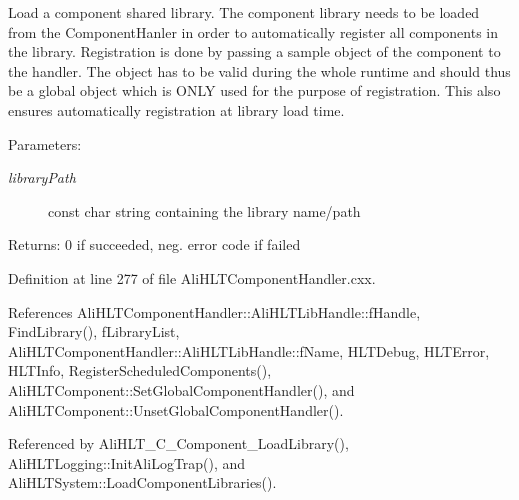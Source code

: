 Load a component shared library. The component library needs to be loaded from the Component\-Hanler in order to automatically register all components in the library. Registration is done by passing a sample object of the component to the handler. The object has to be valid during the whole runtime and should thus be a global object which is ONLY used for the purpose of registration. This also ensures automatically registration at library load time. \begin{Desc}
\item[Parameters:]
\begin{description}
\item[{\em library\-Path}]const char string containing the library name/path \end{description}
\end{Desc}
\begin{Desc}
\item[Returns:]0 if succeeded, neg. error code if failed \end{Desc}


Definition at line 277 of file Ali\-HLTComponent\-Handler.cxx.

References Ali\-HLTComponent\-Handler::Ali\-HLTLib\-Handle::f\-Handle, Find\-Library(), f\-Library\-List, Ali\-HLTComponent\-Handler::Ali\-HLTLib\-Handle::f\-Name, HLTDebug, HLTError, HLTInfo, Register\-Scheduled\-Components(), Ali\-HLTComponent::Set\-Global\-Component\-Handler(), and Ali\-HLTComponent::Unset\-Global\-Component\-Handler().

Referenced by Ali\-HLT\_\-C\_\-Component\_\-Load\-Library(), Ali\-HLTLogging::Init\-Ali\-Log\-Trap(), and Ali\-HLTSystem::Load\-Component\-Libraries().


